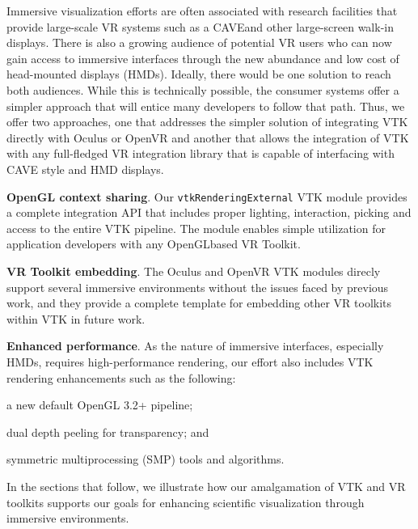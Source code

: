 Immersive visualization efforts are often associated with research
facilities that provide large-scale VR systems such as a CAVE\texttrademark and
other large-screen walk-in displays.
There is also a growing audience of potential VR users who can now
gain access to immersive interfaces through the new abundance and low cost
of head-mounted displays (HMDs).
Ideally, there would be one solution to reach both audiences. While this is
technically possible, the consumer systems offer a simpler
approach that will entice many developers to follow that path.
Thus, we offer two approaches, one that addresses the simpler solution
of integrating VTK directly with Oculus or OpenVR and another that allows the integration of VTK with
any full-fledged VR integration library that is capable of interfacing
with CAVE style and HMD displays.

\textbf{OpenGL context sharing}.
Our \texttt{vtkRenderingExternal} VTK module provides a complete integration API
that includes proper lighting, interaction, picking and access to the entire
VTK pipeline.
The module enables simple utilization for application developers with
any OpenGLbased VR Toolkit.

\textbf{VR Toolkit embedding}.
The Oculus and OpenVR VTK modules direcly support several immersive environments
without the issues faced by previous work, and they provide a complete template
for embedding other VR toolkits within VTK in future work.

\textbf{Enhanced performance}.
As the nature of immersive interfaces, especially HMDs, requires
high-performance rendering, our effort also includes VTK rendering enhancements
such as the following:

\begin{compactitem}
\item a new default OpenGL 3.2+ pipeline;
\item dual depth peeling for transparency; and 
\item symmetric multiprocessing (SMP) tools and algorithms.
\end{compactitem}

In the sections that follow, we illustrate how our amalgamation of VTK and VR toolkits supports our goals for enhancing scientific visualization through immersive environments.

